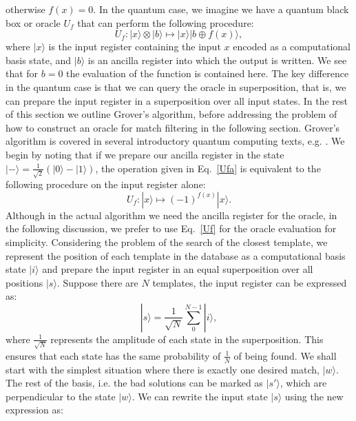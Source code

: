 \documentclass[aps,prd,nofootinbib,twocolumn,reprint,superscriptaddress,showpacs,showkeys,longbibliography]{revtex4-1}
\newcommand{\ket}[1]{|#1\rangle}
\begin{document}
otherwise $f(x)=0$. In the quantum case, we imagine we have a quantum black box or oracle $U_f$ that can perform the following procedure:
\begin{equation}
    \label{Ufa}
    U_f: \ket{x}\otimes\ket{b}\longmapsto\ket{x}\ket{b \oplus f(x)},
\end{equation}
where $\ket{x}$ is the input register containing the input $x$ encoded as a computational basis state, and $\ket{b}$ is an ancilla register into which the output is written. We see that for $b=0$ the evaluation of the function is contained here. The key difference in the quantum case is that we can query the oracle in superposition, that is, we can prepare the input register in a superposition over all input states. In the rest of this section we outline Grover's algorithm, before addressing the problem of how to construct an oracle for match filtering in the following section. Grover's algorithm is covered in several introductory quantum computing texts, e.g. \cite{barnett2009quantum, nielsen2002quantum,kaye2007introduction}. We begin by noting that if we prepare our ancilla register in the state $\ket{-}=\frac{1}{\sqrt{2}}(\ket{0}-\ket{1})$, the operation given in Eq.~\ref{Ufa} is equivalent to the following procedure on the input register alone:
\begin{equation}
    \label{Uf}
    U_f: \ket{x}\longmapsto(-1)^{f(x)}\ket{x}.
\end{equation}
Although in the actual algorithm we need the ancilla register for the oracle, in the following discussion, we prefer to use Eq.~\ref{Uf} for the oracle evaluation for simplicity. 
\newline\newline Considering the problem of the search of the closest template, we represent the position of each template in the database as a computational basis state $\ket{i}$ and prepare the input register in an equal superposition over all positions $\ket{s}$. Suppose there are $N$ templates, the input register can be expressed as:
\begin{equation}
    \label{soo}
    \ket{s}=\frac{1}{\sqrt{N}}\sum^{N-1}_{0} \ket{i},
\end{equation}
where $\frac{1}{\sqrt{N}}$ represents the amplitude of each state in the superposition. This ensures that each state has the same probability of $\frac{1}{N}$ of being found. We shall start with the simplest situation where there is exactly one desired match, $\ket{w}$. The rest of the basis, i.e. the bad solutions can be marked as $\ket{s'}$, which are perpendicular to the state $\ket{w}$. We can rewrite the input state $\ket{s}$ using the new expression as:
\end{document}
